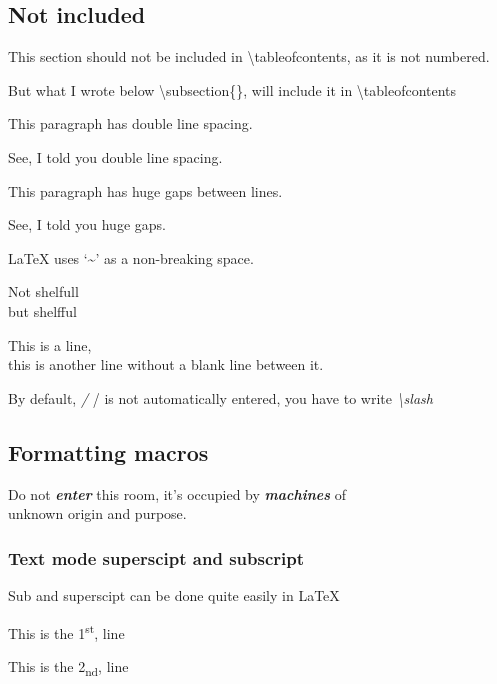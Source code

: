 \documentclass[12pt,a4paper,oneside]{article}
\newcommand{\oops}[1]{\textbf{\textit{#1}}}
\begin{document}
\subsection*{Not included}

This section should not be included in \textbackslash{}tableofcontents, as it is not numbered.

But what I wrote below \textbackslash{}subsection\{\}, will include it in \textbackslash{}tableofcontents

\begin{doublespace}
	This paragraph has double line spacing.

	See, I told you double line spacing.
\end{doublespace}

\begin{spacing}{2.5}
	This paragraph has huge gaps between lines.

	See, I told you huge gaps.
\end{spacing}

{\LaTeX} uses `\textasciitilde' as a non-breaking space.


\bgroup\Large Not shelfull\\
but shelf{}ful\egroup{}

This is a line,\\
this is another line without a blank line between it.

By default, \emph{\slash} / is not automatically entered, you have to write \emph{\textbackslash{}slash}

\subsection{Formatting macros}

Do not \oops{enter} this room, it's occupied by \oops{machines} of \\[10pt] unknown origin and purpose.

\subsubsection{Text mode superscipt and subscript}

Sub and superscipt can be done quite easily in {\LaTeX}

This is the 1\textsuperscript{st}, line

This is the 2\textsubscript{nd}, line
\end{document}
